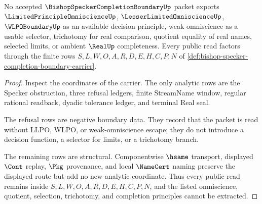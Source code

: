 \begin{theorem}
\label{thm:bishop-specker-completion-boundary-omniscience-nonescape}
No accepted $\BishopSpeckerCompletionBoundaryUp$ packet exports $\LimitedPrincipleOmniscienceUp$, $\LesserLimitedOmniscienceUp$, $\WLPOBoundaryUp$ as an available decision principle, weak omniscience as a usable selector, trichotomy for real comparison, quotient equality of real names, selected limits, or ambient $\RealUp$ completeness. Every public read factors through the finite rows $S,L,W,O,A,R,D,E,H,C,P,N$ of \autoref{def:bishop-specker-completion-boundary-carrier}.
\end{theorem}
\begin{proof}
Inspect the coordinates of the carrier. The only analytic rows are the Specker obstruction, three refusal ledgers, finite StreamName window, regular rational readback, dyadic tolerance ledger, and terminal Real seal.

The refusal rows are negative boundary data. They record that the packet is read without LLPO, WLPO, or weak-omniscience escape; they do not introduce a decision function, a selector for limits, or a trichotomy branch.

The remaining rows are structural. Componentwise $\hsame$ transport, displayed $\Cont$ replay, $\Pkg$ provenance, and local $\NameCert$ naming preserve the displayed route but add no new analytic coordinate. Thus every public read remains inside $S,L,W,O,A,R,D,E,H,C,P,N$, and the listed omniscience, quotient, selection, trichotomy, and completion principles cannot be extracted.
\end{proof}



